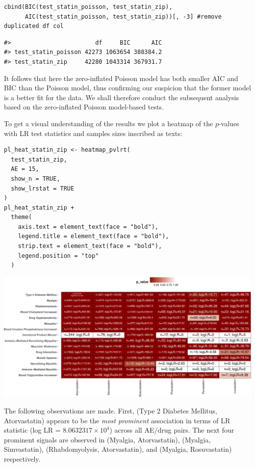 \begin{verbatim}
cbind(BIC(test_statin_poisson, test_statin_zip),
      AIC(test_statin_poisson, test_statin_zip))[, -3] #remove duplicated df col
\end{verbatim}

\begin{verbatim}
#>                        df     BIC      AIC
#> test_statin_poisson 42273 1063654 388384.2
#> test_statin_zip     42280 1043314 367931.7
\end{verbatim}

\noindent It follows that here the zero-inflated Poisson model has both smaller AIC and BIC than the Poisson model, thus confirming our suspicion that the former model is a better fit for the data. We shall therefore conduct the subsequent analysis based on the zero-inflated Poisson model-based tests.

To get a visual understanding of the results we plot a heatmap of the \(p\)-values with LR test statistics and samples sizes inscribed as texts:

\begin{verbatim}
pl_heat_statin_zip <- heatmap_pvlrt(
  test_statin_zip,
  AE = 15,
  show_n = TRUE,
  show_lrstat = TRUE
) 
pl_heat_statin_zip +
  theme(
    axis.text = element_text(face = "bold"),
    legend.title = element_text(face = "bold"),
    strip.text = element_text(face = "bold"),
    legend.position = "top"
  )
\end{verbatim}

\begin{center}\includegraphics[width=1\linewidth]{pvlrt-package-paper-Rjournal_files/figure-latex/heatmap-zip-statin-latex-1} \end{center}

The following observations are made. First, (Type 2 Diabetes Mellitus, Atorvastatin) appears to be the \emph{most prominent} association in terms of LR statistic (log LR = \ensuremath{8.0632317\times 10^{4}}) across all AE/drug pairs. The next four prominent signals are observed in (Myalgia, Atorvastatin), (Myalgia, Simvastatin), (Rhabdomyolysis, Atorvastatin), and (Myalgia, Rosuvastatin) respectively.


